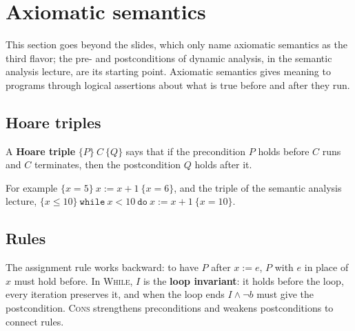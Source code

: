 \section{Axiomatic semantics}
\label{sec:axiomatic}

This section goes beyond the slides, which only name axiomatic semantics as
the third flavor; the pre- and postconditions of dynamic analysis, in the
semantic analysis lecture, are its starting point. Axiomatic semantics gives
meaning to programs through logical assertions about what is true before and
after they run.

\subsection{Hoare triples}

\begin{definition}
A \textbf{Hoare triple} $\{P\}\ C\ \{Q\}$ says that if the precondition $P$ holds
before $C$ runs and $C$ terminates, then the postcondition $Q$ holds after it.
\end{definition}

For example $\{x = 5\}\ x := x + 1\ \{x = 6\}$, and the triple of the semantic
analysis lecture, $\{x \le 10\}\ \mathtt{while}\ x < 10\ \mathtt{do}\ x := x + 1\ \{x = 10\}$.

\subsection{Rules}

The assignment rule works backward: to have $P$ after $x := e$, $P$ with $e$ in
place of $x$ must hold before. In \textsc{While}, $I$ is the \textbf{loop
invariant}: it holds before the loop, every iteration preserves it, and when
the loop ends $I \wedge \neg b$ must give the postcondition. \textsc{Cons}
strengthens preconditions and weakens postconditions to connect rules.

